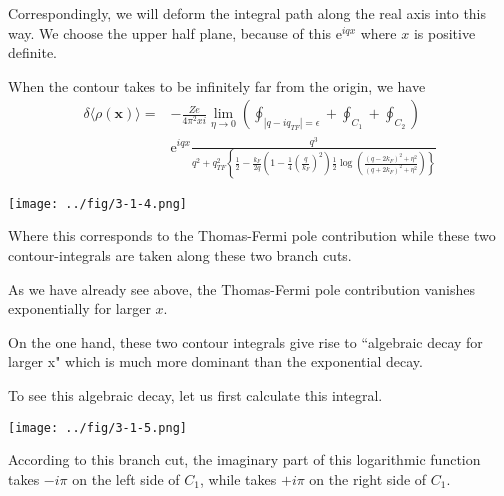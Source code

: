 \begin{itemize}
Correspondingly, we will deform the integral path along the real axis into this way. We choose the upper half plane, because of this $\mathrm{e}^{i q x}$ where $x$ is positive definite.

When the contour takes to be infinitely far from the origin, we have
\begin{equation} \label{Eqs3.1.32} \begin{split}
\delta \langle \rho(\mathbf{x}) \rangle =& -\frac{Z e}{4\pi^2 x i} \lim_{\eta \rightarrow 0} \left( \oint_{|q-i q_{TF}| = \epsilon} + \oint_{C_1} + \oint_{C_2} \right)\\
& \mathrm{e}^{i q x} \frac{q^3}{q^2 + q_{TF}^2 \left\{\frac{1}{2}-\frac{k_F}{2q}\left( 1-\frac{1}{4}(\frac{q}{k_F})^2 \right) \frac{1}{2} \log \left( \frac{(q-2 k_F)^2 + \eta^2}{(q + 2 k_F)^2 + \eta^2}\right) \right\}}
\end{split}\end{equation}

\begin{center} \label{Fig3.1.4}
\texttt{[image: ../fig/3-1-4.png]}
\end{center}

Where this corresponds to the Thomas-Fermi pole contribution while these two contour-integrals are taken along these two branch cuts.

As we have already see above, the Thomas-Fermi pole contribution vanishes exponentially for larger $x$.

On the one hand, these two contour integrals give rise to ``algebraic decay for larger x" which is much more dominant than the exponential decay.

To see this algebraic decay, let us first calculate this integral.
\begin{center} \label{Fig3.1.5}
\texttt{[image: ../fig/3-1-5.png]}
\end{center}

According to this branch cut, the imaginary part of this logarithmic function takes $-i \pi$ on the left side of $C_1$, while takes $+i \pi$ on the right side of $C_1$.


\end{itemize}
